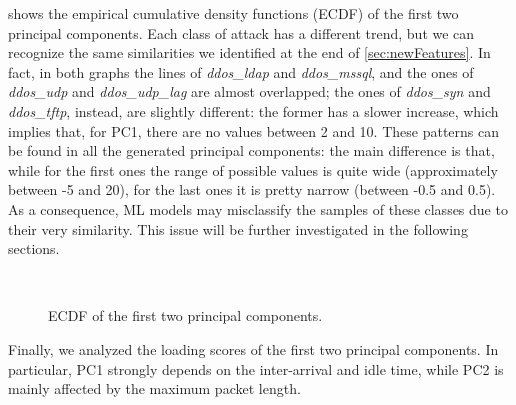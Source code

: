 \documentclass[acmlarge,nonacm]{acmart}
\begin{document}
 shows the empirical cumulative density functions (ECDF) of the first two principal components. Each class of attack has a different trend, but we can recognize the same similarities we identified at the end of \cref{sec:newFeatures}. In fact, in both graphs the lines of \emph{ddos\_ldap} and \emph{ddos\_mssql}, and the ones of \emph{ddos\_udp} and \emph{ddos\_udp\_lag} are almost overlapped; the ones of \emph{ddos\_syn} and \emph{ddos\_tftp}, instead, are slightly different: the former has a slower increase, which implies that, for PC1, there are no values between 2 and 10. These patterns can be found in all the generated principal components: the main difference is that, while for the first ones the range of possible values is quite wide (approximately between -5 and 20), for the last ones it is pretty narrow (between -0.5 and 0.5). As a consequence, ML models may misclassify the samples of these classes due to their very similarity. This issue will be further investigated in the following sections.

\begin{figure}
	\centering
     \quad
	 \\
  	\caption{ECDF of the first two principal components.} 
    \label{fig:ecdfPC}
\end{figure}

Finally, we analyzed the loading scores of the first two principal components. In particular, PC1 strongly depends on the inter-arrival and idle time, while PC2 is mainly affected by the maximum packet length.
\end{document}
